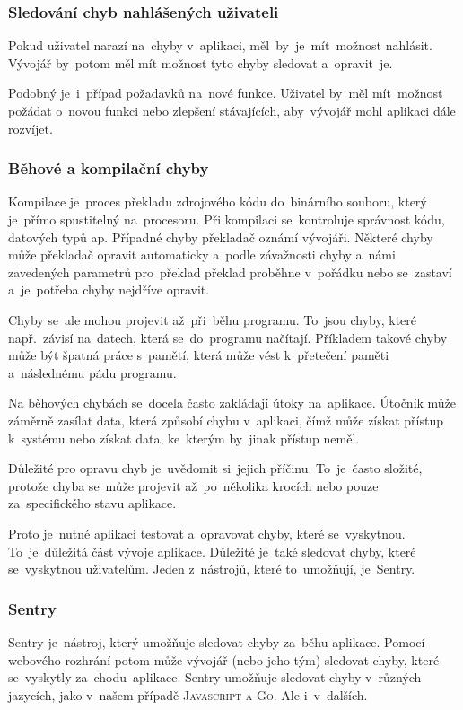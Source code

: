 \documentclass[14pt,a4paper]{article}
\begin{document}
            \subsubsection{Sledování chyb nahlášených uživateli}
            Pokud uživatel narazí na~chyby v~aplikaci, měl~by~je~mít~možnost nahlásit. Vývojář by~potom měl mít možnost tyto chyby sledovat a~opravit~je.

            Podobný je~i~případ požadavků na~nové funkce. Uživatel by~měl mít~možnost požádat o~novou funkci nebo zlepšení stávajících,
            aby~vývojář mohl aplikaci dále rozvíjet.

            \subsubsection{Běhové a kompilační chyby}
            Kompilace je~proces překladu zdrojového kódu do~binárního souboru, který je~přímo spustitelný na~procesoru.
            Při kompilaci se~kontroluje správnost kódu, datových typů ap. Případné chyby překladač oznámí vývojáři.
            Některé chyby může překladač opravit automaticky a~podle závažnosti chyby a~námi zavedených parametrů pro~překlad
            překlad proběhne v~pořádku nebo se~zastaví a~je~potřeba chyby nejdříve opravit.

            Chyby se~ale mohou projevit až~při~běhu programu. To~jsou chyby, které např.~závisí na~datech, která se~do~programu načítají.
            Příkladem takové chyby může být špatná práce s~pamětí, která může vést k~přetečení paměti a~následnému pádu programu.

            Na běhových chybách se~docela často zakládají útoky na~aplikace. Útočník může záměrně zasílat data, která způsobí chybu v~aplikaci,
            čímž může získat přístup k~systému nebo získat data, ke~kterým by~jinak přístup neměl.

            Důležité pro opravu chyb je~uvědomit si~jejich příčinu. To~je~často složité, protože chyba se~může projevit až~po~několika krocích nebo pouze za~specifického stavu aplikace.

            Proto je~nutné aplikaci testovat a~opravovat chyby, které se~vyskytnou. To~je~důležitá část vývoje aplikace. Důležité je~také sledovat
            chyby, které se~vyskytnou uživatelům. Jeden z~nástrojů, které to~umožňují, je~Sentry.

            \subsubsection{Sentry}
            Sentry je~nástroj, který umožňuje sledovat chyby za~běhu aplikace.
            Pomocí webového rozhrání potom může vývojář (nebo jeho tým) sledovat chyby, které se~vyskytly za~chodu~aplikace.
            Sentry umožňuje sledovat chyby v~různých jazycích, jako v~našem případě \textsc{Javascript a Go}. Ale i~v~dalších.
\end{document}

